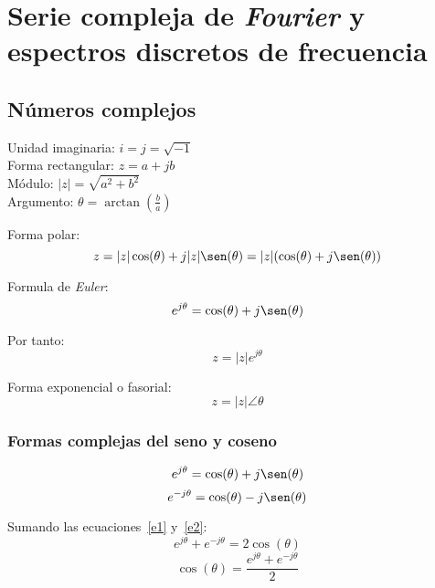 \chapter{Serie compleja de \emph{Fourier} y espectros discretos de frecuencia}

\section{Números complejos}
\begin{figure}[H]
    \centering
    
\end{figure}
\begin{center}
    Unidad imaginaria: $i=j=\sqrt{-1}$\\
    Forma rectangular: $z=a+jb$\\
    Módulo: $|z|=\sqrt{a^2+b^2}$\\
    Argumento: $\theta=\arctan(\frac{b}{a})$\\
\end{center}

Forma polar:
\begin{equation*}
    z=|z|\cos(\theta)+j|z|\sen(\theta)
        =|z|(\cos(\theta)+j\sen(\theta))
\end{equation*}

Formula de \emph{Euler}:
\begin{equation}
    e^{j\theta}=\cos(\theta)+j\sen(\theta)
\end{equation}

Por tanto:
\begin{equation*}
    z=|z|e^{j\theta}
\end{equation*}

Forma exponencial o fasorial:
\begin{equation*}
    z=|z|\angle\theta
\end{equation*}

\subsection{Formas complejas del seno y coseno}
\begin{equation}
    e^{j\theta}=\cos(\theta)+j\sen(\theta)
    \label{e1}
\end{equation}
\begin{equation}
    e^{-j\theta}=\cos(\theta)-j\sen(\theta)
    \label{e2}
\end{equation}

Sumando las ecuaciones~\ref{e1} y~\ref{e2}:
\begin{equation*}
    e^{j\theta}+e^{-j\theta}=2\cos(\theta)
\end{equation*}
\begin{equation}
    \cos(\theta)=\frac{e^{j\theta}+e^{-j\theta}}{2}
\end{equation}

